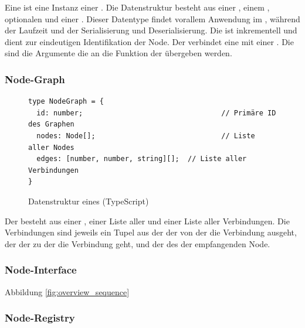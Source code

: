 \documentclass[ngerman]{article}
\begin{document}
Eine  ist eine Instanz einer . Die Datenstruktur besteht aus einer , einem , optionalen  und einer . 
Dieser Datentype findet vorallem Anwendung im , während der Laufzeit und der Serialisierung und Deserialisierung.
\br
Die  ist inkrementell und dient zur eindeutigen Identifikation der Node. Der  verbindet eine  mit einer .
Die  sind die Argumente die an die  Funktion der  übergeben werden.

\subsubsection*{Node-Graph}

\begin{figure}[htbp]
  \begin{code}
    \begin{verbatim}
type NodeGraph = {
  id: number;                                 // Primäre ID des Graphen
  nodes: Node[];                              // Liste aller Nodes
  edges: [number, number, string][];  // Liste aller Verbindungen
}
    \end{verbatim}
  \end{code}

  \caption{Datenstruktur eines  (TypeScript)}
  \label{fig:data_node_graph}

\end{figure}

Der  besteht aus einer , einer Liste aller  und einer Liste aller Verbindungen. 
Die Verbindungen sind jeweils ein Tupel aus der  der  von der die Verbindung ausgeht, der  der  zu der die Verbindung geht, und der  des  der empfangenden Node.

\pagebreak

\subsubsection{Node-Interface}
Abbildung \ref{fig:overview_sequence}
\label{sec:node_interface}

\subsubsection{Node-Registry}
\label{sec:node_registry}
\end{document}
